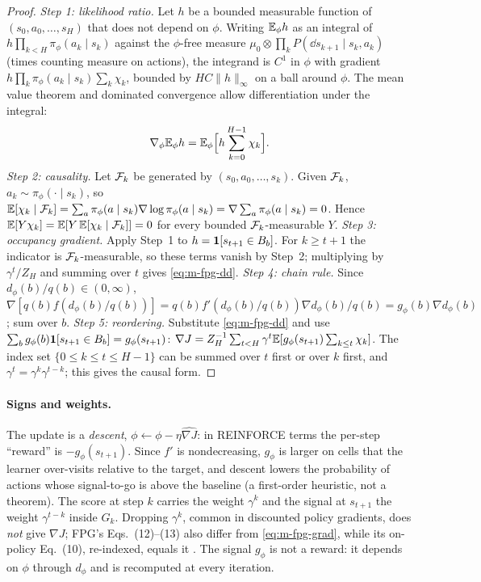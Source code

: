 \begin{proof}
\emph{Step 1: likelihood ratio.} Let $h$ be a bounded measurable function of $(s_0,a_0,\dots,s_H)$ that does not depend on $\phi$. Writing $\mathbb{E}_\phi h$ as an integral of $h\prod_{k<H}\pi_\phi(a_k\mid s_k)$ against the $\phi$-free measure $\mu_0\otimes\prod_kP(\dd s_{k+1}\mid s_k,a_k)$ (times counting measure on actions), the integrand is $C^1$ in $\phi$ with gradient $h\prod_k\pi_\phi(a_k\mid s_k)\sum_k\chi_k$, bounded by $H C\lVert h\rVert_\infty$ on a ball around $\phi$. The mean value theorem and dominated convergence allow differentiation under the integral:
\[
\nabla_\phi\mathbb{E}_\phi h=\mathbb{E}_\phi\Big[h\sum_{k=0}^{H-1}\chi_k\Big].
\]
\emph{Step 2: causality.} Let $\mathcal{F}_k$ be generated by $(s_0,a_0,\dots,s_k)$. Given $\mathcal{F}_k$, $a_k\sim\pi_\phi(\cdot\mid s_k)$, so $\mathbb{E}[\chi_k\mid\mathcal{F}_k]=\sum_a\pi_\phi(a\mid s_k)\nabla\log\pi_\phi(a\mid s_k)=\nabla\sum_a\pi_\phi(a\mid s_k)=0$. Hence $\mathbb{E}[Y\chi_k]=\mathbb{E}[Y\,\mathbb{E}[\chi_k\mid\mathcal{F}_k]]=0$ for every bounded $\mathcal{F}_k$-measurable $Y$.
\emph{Step 3: occupancy gradient.} Apply Step~1 to $h=\mathbf{1}[s_{t+1}\in B_b]$. For $k\ge t+1$ the indicator is $\mathcal{F}_k$-measurable, so these terms vanish by Step~2; multiplying by $\gamma^t/Z_H$ and summing over $t$ gives \eqref{eq:m-fpg-dd}.
\emph{Step 4: chain rule.} Since $d_\phi(b)/q(b)\in(0,\infty)$, $\nabla[q(b)f(d_\phi(b)/q(b))]=q(b)f'(d_\phi(b)/q(b))\nabla d_\phi(b)/q(b)=g_\phi(b)\nabla d_\phi(b)$; sum over $b$.
\emph{Step 5: reordering.} Substitute \eqref{eq:m-fpg-dd} and use $\sum_bg_\phi(b)\mathbf{1}[s_{t+1}\in B_b]=g_\phi(s_{t+1})$:
$\nabla J=Z_H^{-1}\sum_{t<H}\gamma^t\mathbb{E}[g_\phi(s_{t+1})\sum_{k\le t}\chi_k]$. The index set $\{0\le k\le t\le H-1\}$ can be summed over $t$ first or over $k$ first, and $\gamma^t=\gamma^k\gamma^{t-k}$; this gives the causal form.
\end{proof}

\paragraph{Signs and weights.}
The update is a \emph{descent}, $\phi\leftarrow\phi-\eta\widehat{\nabla J}$: in REINFORCE terms \citep{williams1992simple,sutton2000policy} the per-step ``reward'' is $-g_\phi(s_{t+1})$. Since $f'$ is nondecreasing, $g_\phi$ is larger on cells that the learner over-visits relative to the target, and descent lowers the probability of actions whose signal-to-go is above the baseline (a first-order heuristic, not a theorem).
The score at step $k$ carries the weight $\gamma^k$ and the signal at $s_{t+1}$ the weight $\gamma^{t-k}$ inside $G_k$. Dropping $\gamma^k$, common in discounted policy gradients, does \emph{not} give $\nabla J$; FPG's Eqs.~(12)--(13) also differ from \eqref{eq:m-fpg-grad}, while its on-policy Eq.~(10), re-indexed, equals it .
The signal $g_\phi$ is not a reward: it depends on $\phi$ through $d_\phi$ and is recomputed at every iteration.

